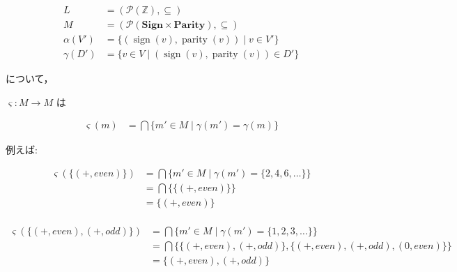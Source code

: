 \documentclass[uplatex]{jsarticle}
\begin{document}
\begin{align*}
  L          & = (\mathcal{P}(\mathbb{Z}), \subseteq)                                         \\
  M          & = (\mathcal{P}(\textbf{Sign} \times \textbf{Parity}), \subseteq)               \\
  \alpha(V') & = \{ (\operatorname{sign}(v), \operatorname{parity}(v)) \mid v \in V' \}       \\
  \gamma(D') & = \{ v \in V \mid (\operatorname{sign}(v), \operatorname{parity}(v)) \in D' \}
\end{align*}

について，

$\varsigma: M \to M$ は

\begin{align*}
  \varsigma(m) & = \bigcap \{ m' \in M \mid \gamma(m') = \gamma(m) \}
\end{align*}

例えば:

\begin{align*}
  \varsigma(\{ (\mathord{+}, \mathord{even}) \}) & = \bigcap \{ m' \in M \mid \gamma(m') = \{2, 4, 6, \ldots\} \} \\
                                                 & = \bigcap \{ \{(\mathord{+}, \mathord{even})\} \}              \\
                                                 & = \{ (\mathord{+}, \mathord{even}) \}                          \\
\end{align*}

\begin{align*}
  \varsigma(\{ (\mathord{+}, \mathord{even}), (\mathord{+}, \mathord{odd}) \}) & = \bigcap \{ m' \in M \mid \gamma(m') = \{1, 2, 3, \ldots\} \}      \\
                                                                               & = \bigcap \{ \{
  (\mathord{+}, \mathord{even}),
  (\mathord{+}, \mathord{odd})
  \},
  \{
  (\mathord{+}, \mathord{even}),
  (\mathord{+}, \mathord{odd}),
  (\mathord{0}, \mathord{even})
  \}
  \}                                                                                                                                                 \\
                                                                               & = \{ (\mathord{+}, \mathord{even}), (\mathord{+}, \mathord{odd}) \} \\
\end{align*}
\end{document}
